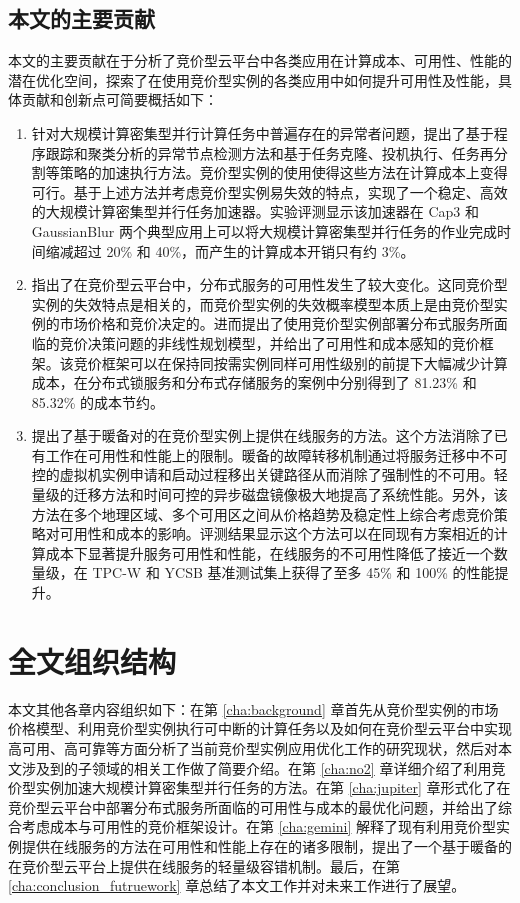 \subsection{本文的主要贡献}
本文的主要贡献在于分析了竞价型云平台中各类应用在计算成本、可用性、性能的潜在优化空间，探索了在使用竞价型实例的各类应用中如何提升可用性及性能，具体贡献和创新点可简要概括如下：
\begin{enumerate}
\item 针对大规模计算密集型并行计算任务中普遍存在的异常者问题，提出了基于程序跟踪和聚类分析的异常节点检测方法和基于任务克隆、投机执行、任务再分割等策略的加速执行方法。竞价型实例的使用使得这些方法在计算成本上变得可行。基于上述方法并考虑竞价型实例易失效的特点，实现了一个稳定、高效的大规模计算密集型并行任务加速器。实验评测显示该加速器在 Cap3 和 GaussianBlur 两个典型应用上可以将大规模计算密集型并行任务的作业完成时间缩减超过 20\% 和 40\%，而产生的计算成本开销只有约 3\%。
\item 指出了在竞价型云平台中，分布式服务的可用性发生了较大变化。这同竞价型实例的失效特点是相关的，而竞价型实例的失效概率模型本质上是由竞价型实例的市场价格和竞价决定的。进而提出了使用竞价型实例部署分布式服务所面临的竞价决策问题的非线性规划模型，并给出了可用性和成本感知的竞价框架。该竞价框架可以在保持同按需实例同样可用性级别的前提下大幅减少计算成本，在分布式锁服务和分布式存储服务的案例中分别得到了 81.23\% 和 85.32\% 的成本节约。
\item 提出了基于暖备对的在竞价型实例上提供在线服务的方法。这个方法消除了已有工作在可用性和性能上的限制。暖备的故障转移机制通过将服务迁移中不可控的虚拟机实例申请和启动过程移出关键路径从而消除了强制性的不可用。轻量级的迁移方法和时间可控的异步磁盘镜像极大地提高了系统性能。另外，该方法在多个地理区域、多个可用区之间从价格趋势及稳定性上综合考虑竞价策略对可用性和成本的影响。评测结果显示这个方法可以在同现有方案相近的计算成本下显著提升服务可用性和性能，在线服务的不可用性降低了接近一个数量级，在 TPC-W 和 YCSB 基准测试集上获得了至多 45\% 和 100\% 的性能提升。
\end{enumerate}

\section{全文组织结构}
本文其他各章内容组织如下：在第 \ref{cha:background} 章首先从竞价型实例的市场价格模型、利用竞价型实例执行可中断的计算任务以及如何在竞价型云平台中实现高可用、高可靠等方面分析了当前竞价型实例应用优化工作的研究现状，然后对本文涉及到的子领域的相关工作做了简要介绍。在第 \ref{cha:no2} 章详细介绍了利用竞价型实例加速大规模计算密集型并行任务的方法。在第 \ref{cha:jupiter} 章形式化了在竞价型云平台中部署分布式服务所面临的可用性与成本的最优化问题，并给出了综合考虑成本与可用性的竞价框架设计。在第 \ref{cha:gemini} 解释了现有利用竞价型实例提供在线服务的方法在可用性和性能上存在的诸多限制，提出了一个基于暖备的在竞价型云平台上提供在线服务的轻量级容错机制。最后，在第 
\ref{cha:conclusion_futruework} 章总结了本文工作并对未来工作进行了展望。
